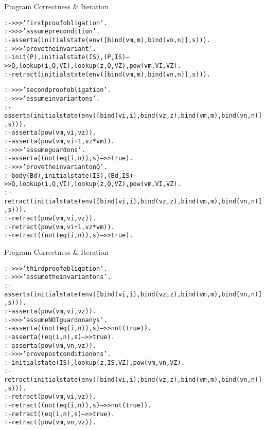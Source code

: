 \documentclass{beamer}
\begin{document}
\begin{frame}[fragile]{Program Correctness \& Iteration}
\tiny
\begin{alltt}
:- >>> 'first proof obligation'.
:- >>> 'assume precondition'.
:- asserta(initialstate(env([bind(vm,m),bind(vn,n)],s))).
:- >>> 'prove the invariant'.
:- init(P),initialstate(IS),(P,IS) -->> Q,lookup(i,Q,VI),lookup(z,Q,VZ),pow(vm,VI,VZ).
:- retract(initialstate(env([bind(vm,m),bind(vn,n)],s))).

:- >>> 'second  proof obligation'.
:- >>> 'assume invariant on s'.
:- asserta(initialstate(env([bind(vi,i),bind(vz,z),bind(vm,m),bind(vn,n)],s))).
:- asserta(pow(vm,vi,vz)).
% implies                                                                                                                                    
:- asserta(pow(vm,vi+1,vz*vm)).
:- >>> 'assume guard on s'.
:- asserta((not(eq(i,n)),s) -->> true).
:- >>> 'prove the invariant on Q'.
:- body(Bd),initialstate(IS),(Bd,IS) -->> Q,lookup(i,Q,VI),lookup(z,Q,VZ),pow(vm,VI,VZ).
:- retract(initialstate(env([bind(vi,i),bind(vz,z),bind(vm,m),bind(vn,n)],s))).
:- retract(pow(vm,vi,vz)).
:- retract(pow(vm,vi+1,vz*vm)).
:- retract((not(eq(i,n)),s) -->> true).
\end{alltt}
\end{frame}

\begin{frame}[fragile]{Program Correctness \& Iteration}
\tiny
\begin{alltt}
:- >>> 'third  proof obligation'.
:- >>> 'assume the invariant on s'.
:- asserta(initialstate(env([bind(vi,i),bind(vz,z),bind(vm,m),bind(vn,n)],s))).
:- asserta(pow(vm,vi,vz)).
:- >>> 'assume NOT guard on any s'.
:- asserta((not(eq(i,n)),s) -->> not(true)).
% implies                                                                                                                                    
:- asserta((eq(i,n),s) -->> true).
% implies                                                                                                                                    
:- asserta(pow(vm,vn,vz)).
:- >>> 'prove postcondition on s'.
:- initialstate(IS),lookup(z,IS,VZ),pow(vm,vn,VZ).
:- retract(initialstate(env([bind(vi,i),bind(vz,z),bind(vm,m),bind(vn,n)],s))).
:- retract(pow(vm,vi,vz)).
:- retract((not(eq(i,n)),s) -->> not(true)).
:- retract((eq(i,n),s) -->> true).
:- retract(pow(vm,vn,vz)).
\end{alltt}
\end{frame}
\end{document}
